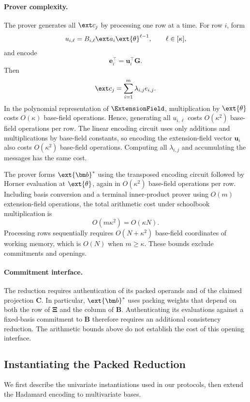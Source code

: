 \paragraph{Prover complexity.}
The prover generates all \(\ext c_j\) by processing
one row at a time.
For row \(i\), form
\[
    u_{i,\ell}
    =
    B_{i,\ell}\ext a_i\ext{\theta}^{\ell-1},
    \qquad \ell\in[\kappa],
\]
and encode
\[
    \bm e_i^\top=\bm u_i^\top\bm G.
\]
Then
\[
    \ext c_j
    =
    \sum_{i=1}^{m}\lambda_{i,j}e_{i,j}.
\]
In the polynomial representation of \(\ExtensionField\),
multiplication by \(\ext{\theta}\) costs
\(O(\kappa)\) base-field operations.
Hence, generating all \(u_{i,\ell}\) costs
\(O(\kappa^2)\) base-field operations per row.
The linear encoding circuit uses only additions and
multiplications by base-field constants, so encoding
the extension-field vector \(\bm u_i\) also costs
\(O(\kappa^2)\) base-field operations.
Computing all \(\lambda_{i,j}\) and accumulating the
messages has the same cost.

The prover forms \(\ext{\bm b}^*\) using the transposed
encoding circuit followed by Horner evaluation at
\(\ext{\theta}\), again in \(O(\kappa^2)\)
base-field operations per row.
Including basis conversion and a terminal inner-product
prover using \(O(m)\) extension-field operations,
the total arithmetic cost under schoolbook multiplication is
\[
    O(m\kappa^2)=O(\kappa N).
\]
Processing rows sequentially requires
\(O(N+\kappa^2)\) base-field coordinates of working memory,
which is \(O(N)\) when \(m\geq\kappa\).
These bounds exclude commitments and openings.

\paragraph{Commitment interface.}
The reduction requires authentication of its packed
operands and of the claimed projection \(\bm C\).
In particular, \(\ext{\bm b}^*\) uses packing weights
that depend on both the row of \(\bm\Xi\) and the column
of \(\bm B\).
Authenticating its evaluations against a fixed-basis
commitment to \(\bm B\) therefore requires an additional
consistency reduction.
The arithmetic bounds above do not establish the cost
of this opening interface.


\subsection{Instantiating the Packed Reduction}

We first describe the univariate instantiations used in our
protocols, then extend the Hadamard encoding to multivariate bases.

